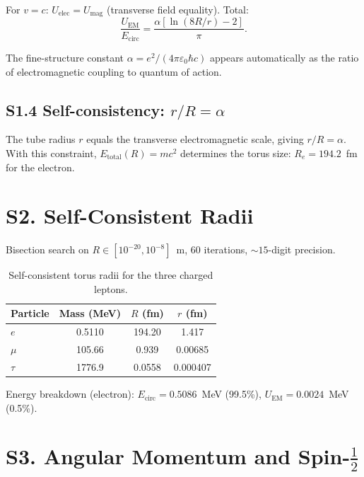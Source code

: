 \documentclass[11pt,a4paper]{article}
\begin{document}
For $v = c$: $U_{\text{elec}} = U_{\text{mag}}$ (transverse field equality). Total:
\begin{equation}
  \frac{U_{\text{EM}}}{E_{\text{circ}}} = \frac{\alpha[\ln(8R/r) - 2]}{\pi}.
\end{equation}

The fine-structure constant $\alpha = e^2/(4\pi\varepsilon_0\hbar c)$ appears automatically as the ratio of electromagnetic coupling to quantum of action.

\subsection{S1.4 Self-consistency: \texorpdfstring{$r/R = \alpha$}{r/R = alpha}}

The tube radius $r$ equals the transverse electromagnetic scale, giving $r/R = \alpha$. With this constraint, $E_{\text{total}}(R) = mc^2$ determines the torus size: $R_e = 194.2$~fm for the electron.

\section{S2. Self-Consistent Radii}
\label{sec:S2}

Bisection search on $R \in [10^{-20}, 10^{-8}]$~m, 60 iterations, ${\sim}15$-digit precision.

\begin{table}[h]
\centering
\begin{tabular}{@{}lccc@{}}
\toprule
Particle & Mass (MeV) & $R$ (fm) & $r$ (fm) \\
\midrule
$e$ & 0.5110 & 194.20 & 1.417 \\
$\mu$ & 105.66 & 0.939 & 0.00685 \\
$\tau$ & 1776.9 & 0.0558 & 0.000407 \\
\bottomrule
\end{tabular}
\caption{Self-consistent torus radii for the three charged leptons.}
\label{tab:radii}
\end{table}

Energy breakdown (electron): $E_{\text{circ}} = 0.5086$~MeV (99.5\%), $U_{\text{EM}} = 0.0024$~MeV (0.5\%).

\section{S3. Angular Momentum and Spin-\texorpdfstring{$\frac{1}{2}$}{1/2}}
\label{sec:S3}
\end{document}
